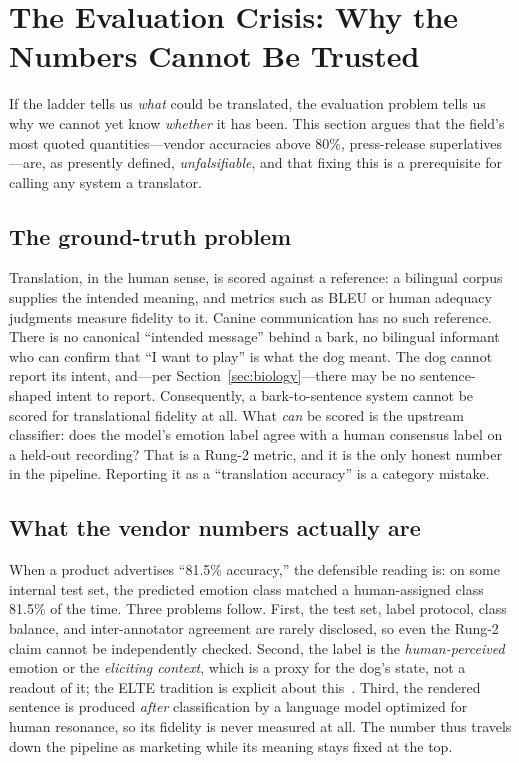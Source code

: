 \section{The Evaluation Crisis: Why the Numbers Cannot Be Trusted}
\label{sec:eval}

If the ladder tells us \emph{what} could be translated, the evaluation
problem tells us why we cannot yet know \emph{whether} it has been. This
section argues that the field's most quoted quantities---vendor accuracies
above 80\%, press-release superlatives---are, as presently defined,
\emph{unfalsifiable}, and that fixing this is a prerequisite for calling any
system a translator.

\subsection{The ground-truth problem}
Translation, in the human sense, is scored against a reference: a bilingual
corpus supplies the intended meaning, and metrics such as BLEU or human
adequacy judgments measure fidelity to it. Canine communication has no such
reference. There is no canonical ``intended message'' behind a bark, no
bilingual informant who can confirm that ``I want to play'' is what the dog
meant. The dog cannot report its intent, and---per
Section~\ref{sec:biology}---there may be no sentence-shaped intent to report.
Consequently, a bark-to-sentence system cannot be scored for translational
fidelity at all. What \emph{can} be scored is the upstream classifier: does
the model's emotion label agree with a human consensus label on a held-out
recording? That is a Rung-2 metric, and it is the only honest number in the
pipeline. Reporting it as a ``translation accuracy'' is a category mistake.

\subsection{What the vendor numbers actually are}
When a product advertises ``81.5\% accuracy,'' the defensible reading is:
on some internal test set, the predicted emotion class matched a
human-assigned class 81.5\% of the time. Three problems follow. First, the
test set, label protocol, class balance, and inter-annotator agreement are
rarely disclosed, so even the Rung-2 claim cannot be independently checked.
Second, the label is the \emph{human-perceived} emotion or the
\emph{eliciting context}, which is a proxy for the dog's state, not a
readout of it; the ELTE tradition is explicit about
this~\cite{pongracz2006acoustic,icassp2018dogbark}. Third, the rendered
sentence is produced \emph{after} classification by a language model
optimized for human resonance, so its fidelity is never measured at all.
The number thus travels down the pipeline as marketing while its meaning
stays fixed at the top.


